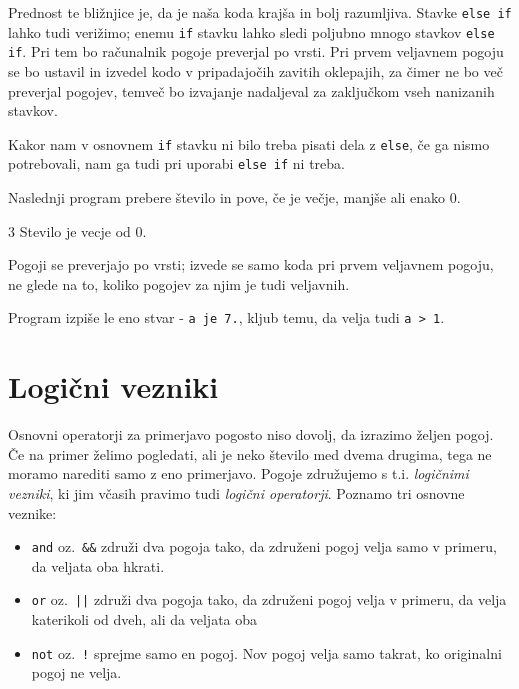 \documentclass{book}
\begin{document}

Prednost te bližnjice je, da je naša koda krajša in bolj razumljiva.
Stavke \verb+else if+ lahko tudi verižimo; enemu \verb+if+ stavku lahko sledi
poljubno mnogo stavkov \verb+else if+. Pri tem bo računalnik pogoje preverjal po
vrsti. Pri prvem veljavnem pogoju se bo ustavil in izvedel kodo v pripadajočih
zavitih oklepajih, za čimer ne bo več preverjal pogojev, temveč bo izvajanje
nadaljeval za zaključkom vseh nanizanih stavkov.

Kakor nam v osnovnem \verb+if+ stavku ni bilo treba pisati dela z \verb+else+,
če ga nismo potrebovali, nam ga tudi pri uporabi \verb+else if+ ni treba.

\begin{examples}
Naslednji program prebere število in pove, če je večje, manjše ali enako 0.


\begin{inout}
3
\tcblower
Stevilo je vecje od 0.
\end{inout}

\end{examples}

\newpage

\begin{examples}
Pogoji se preverjajo po vrsti; izvede se samo koda pri prvem veljavnem pogoju,
ne glede na to, koliko pogojev za njim je tudi veljavnih.


Program izpiše le eno stvar - \verb+a je 7.+, kljub temu, da velja tudi
\verb+a > 1+.

\end{examples}

\section{Logični vezniki}

Osnovni operatorji za primerjavo pogosto niso dovolj, da izrazimo željen pogoj.
Če na primer želimo pogledati, ali je neko število med dvema drugima, tega ne
moramo narediti samo z eno primerjavo.
Pogoje združujemo s t.i. \emph{logičnimi vezniki}, ki jim včasih pravimo tudi
\emph{logični operatorji}. Poznamo tri osnovne veznike:
\begin{itemize}
  \item \verb+and+ oz.~\verb+&&+ združi dva pogoja tako, da združeni pogoj velja
	samo v primeru, da veljata oba hkrati.
  \item \verb+or+ oz.~\verb+||+ združi dva pogoja tako, da združeni pogoj velja
	v primeru, da velja katerikoli od dveh, ali da veljata oba
  \item \verb+not+ oz.~\verb+!+ sprejme samo en pogoj. Nov pogoj velja samo
	takrat, ko originalni pogoj ne velja.
\end{itemize}
\end{document}
